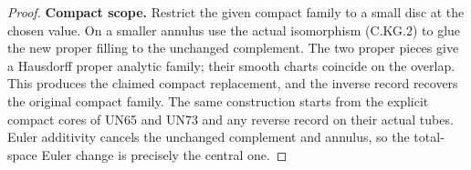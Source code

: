 \begin{proof}
\par\medskip\noindent\textbf{Compact scope.}
Restrict the given compact family
to a small disc at the chosen
value. On a smaller annulus use
the actual isomorphism (C.KG.2)
to glue the new proper filling
to the unchanged complement.
The two proper pieces give a
Hausdorff proper analytic family;
their smooth charts coincide on
the overlap. This produces the
claimed compact replacement,
and the inverse record recovers
the original compact family.
The same construction starts
from the explicit compact cores
of UN65 and UN73 and any reverse
record on their actual tubes.
Euler additivity cancels the
unchanged complement and annulus,
so the total-space Euler change
is precisely the central one.
\end{proof}
